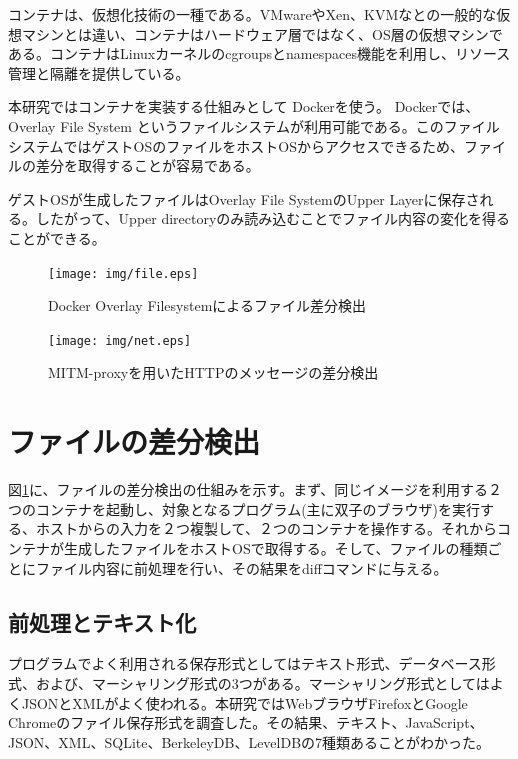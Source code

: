 \documentclass[a4paper,twocolumn,10pt]{jarticle}
\begin{document}
コンテナは、仮想化技術の一種である。VMwareやXen、KVMなとの一般的な仮想マシンとは違い、コンテナはハードウェア層ではなく、OS層の仮想マシンである。コンテナはLinuxカーネルのcgroupsとnamespaces機能を利用し、リソース管理と隔離を提供している。


本研究ではコンテナを実装する仕組みとして Dockerを使う。 Dockerでは、 Overlay File System というファイルシステムが利用可能である。このファイルシステムではゲストOSのファイルをホストOSからアクセスできるため、ファイルの差分を取得することが容易である。

ゲストOSが生成したファイルはOverlay File SystemのUpper Layerに保存される。したがって、Upper directoryのみ読み込むことでファイル内容の変化を得ることができる。




\begin{figure}[ht]
\begin{center}
\texttt{[image: img/file.eps]}
\caption{Docker Overlay Filesystemによるファイル差分検出}
\label{figure:file}
\end{center}
\end{figure}

\begin{figure}[ht]
\begin{center}
\texttt{[image: img/net.eps]}
\caption{MITM-proxyを用いたHTTPのメッセージの差分検出}
\label{figure:network}
\end{center}
\end{figure}


\section{ファイルの差分検出}
\label{cha:file}

図\ref{figure:file}に、ファイルの差分検出の仕組みを示す。まず、同じイメージを利用する２つのコンテナを起動し、対象となるプログラム(主に双子のブラウザ)を実行する、ホストからの入力を２つ複製して、２つのコンテナを操作する。それからコンテナが生成したファイルをホストOSで取得する。そして、ファイルの種類ごとにファイル内容に前処理を行い、その結果をdiffコマンドに与える。

\subsection{前処理とテキスト化}
\label{sec:prep}
プログラムでよく利用される保存形式としてはテキスト形式、データベース形式、および、マーシャリング形式の3つがある。マーシャリング形式としてはよくJSONとXMLがよく使われる。本研究ではWebブラウザFirefoxとGoogle Chromeのファイル保存形式を調査した。その結果、テキスト、JavaScript、JSON、XML、SQLite、BerkeleyDB、LevelDBの7種類あることがわかった。
\end{document}
